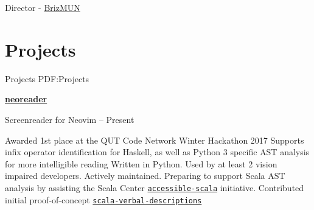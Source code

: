 \documentclass[a4paper,10pt,oneside]{article}
\begin{document}
\begin{body}
\par Director - \href{http://www.brizmun.com/}{BrizMUN} \hfill {}





\section
{Projects}
{Projects}
{PDF:Projects}

\href{https://github.com/MaxwellBo/neoreader}{\textbf{neoreader}} 
\par Screenreader for Neovim\hfill {} -- Present
\begin{detail}
	\BulletItem Awarded 1st place at the QUT Code Network Winter Hackathon 2017
	\BulletItem Supports infix operator identification for Haskell, as well as Python 3 specific AST analysis for more intelligible reading
	\BulletItem Written in Python. Used by at least 2 vision impaired developers. Actively maintained. 
	\BulletItem Preparing to support Scala AST analysis by assisting the Scala Center \href{https://github.com/scalacenter/accessible-scala}{\texttt{accessible-scala}} initiative. Contributed initial proof-of-concept \href{https://github.com/MaxwellBo/scala-verbal-descriptions}{\texttt{scala-verbal-descriptions}}
\end{detail}


\end{body}
\end{document}
